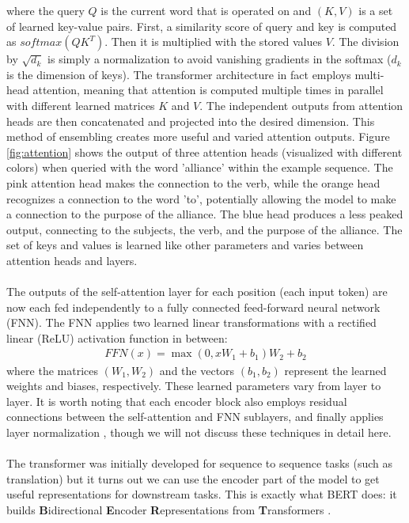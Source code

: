 where the query $Q$ is the current word that is operated on and $(K,V)$ is a set of learned key-value pairs. First, a similarity score of query and key is computed as $softmax(QK^T)$. Then it is multiplied with the stored values $V$. The division by $\sqrt{d_k}$ is simply a normalization to avoid vanishing gradients in the softmax ($d_k$ is the dimension of keys). The transformer architecture in fact employs multi-head attention, meaning that attention is computed multiple times in parallel with different learned matrices $K$ and $V$. The independent outputs from attention heads are then concatenated and projected into the desired dimension. This method of ensembling creates more useful and varied attention outputs. Figure \ref{fig:attention} shows the output of three attention heads (visualized with different colors) when queried with the word 'alliance' within the example sequence. The pink attention head makes the connection to the verb, while the orange head recognizes a connection to the word 'to', potentially allowing the model to make a connection to the purpose of the alliance. The blue head produces a less peaked output, connecting to the subjects, the verb, and the purpose of the alliance. The set of keys and values is learned like other parameters and varies between attention heads and layers. \\\\
The outputs of the self-attention layer for each position (each input token) are now each fed independently to a fully connected feed-forward neural network (FNN). The FNN applies two learned linear transformations with a rectified linear (ReLU) activation function in between:
\begin{gather*}
    FFN(x) = \max (0, xW_1 + b_1)W_2 + b_2
\end{gather*}
where the matrices $(W_1,W_2)$ and the vectors $(b_1,b_2)$ represent the learned weights and biases, respectively. These learned parameters vary from layer to layer. It is worth noting that each encoder block also employs residual connections between the self-attention and FNN sublayers, and finally applies layer normalization \citep{ba2016layer}, though we will not discuss these techniques in detail here. \\\\
The transformer was initially developed for sequence to sequence tasks (such as translation) but it turns out we can use the encoder part of the model to get useful representations for downstream tasks. This is exactly what BERT does: it builds \textbf{B}idirectional \textbf{E}ncoder \textbf{R}epresentations from \textbf{T}ransformers \citep{devlin2018bert}. \\\\
